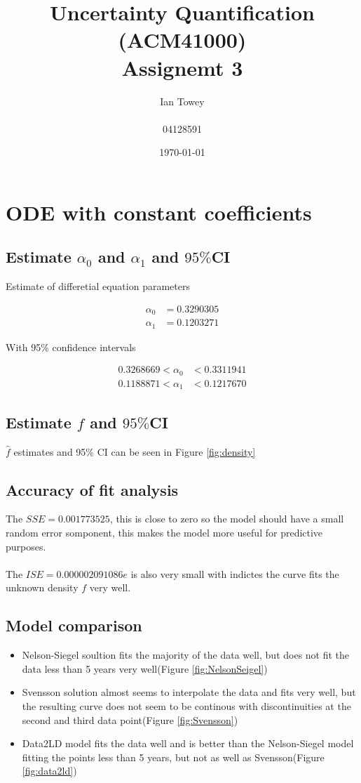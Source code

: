 \documentclass[a4paper]{article}
\title{Uncertainty Quantification (ACM41000) \\ Assignemt 3}
\author{Ian Towey \\ \\ 04128591}
\date{\today}
\begin{document}
  \maketitle

\tableofcontents
\newpage

\section{ODE with constant coefficients}
\subsection{Estimate $\alpha_{0}$ and $\alpha_{1}$ and $95\%$CI}

Estimate of differetial equation parameters

\begin{align*}
  \alpha_{0} &= 0.3290305 \\
  \alpha_{1} &= 0.1203271
\end{align*}


With 95\% confidence intervals

\begin{align*}
  0.3268669 < \alpha_{0} &< 0.3311941 \\
  0.1188871 < \alpha_{1} &< 0.1217670 
\end{align*}

\subsection{Estimate $\hat{f}$ and $95\%$CI}
$\hat{f}$ estimates and 95\% CI can be seen in Figure \ref{fig:density}
\subsection{Accuracy of fit analysis}

The $SSE = 0.001773525$, this is close to zero so the model should have a small random error somponent, this makes the model more useful for predictive purposes. \\ \\

The $ISE = 0.000002091086e$ is also very small with indictes the curve fits the unknown density $f$ very well. 

\subsection{Model comparison}
\begin{itemize}
 \item Nelson-Siegel soultion fits the majority of the data well, but does not fit the data less than 5 years very well(Figure \ref{fig:NelsonSeigel})	
 \item Svensson solution almost seems to interpolate the data and fits very well, but the resulting curve does not seem to be continous with discontinuities at the second and third data point(Figure \ref{fig:Svensson})
 \item Data2LD model fits the data well and is better than the Nelson-Siegel model fitting the points less than 5 years, but not as well as Svensson(Figure \ref{fig:data2ld})
\end{itemize}
\end{document}
